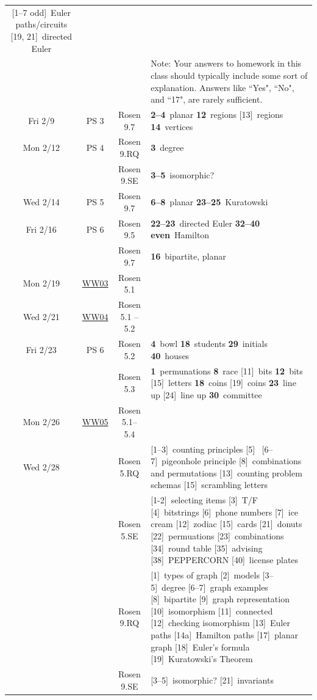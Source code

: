 \documentclass{scrartcl}
\def\WW#1{\href{https://mathwebwork.cs.calvin.edu/webwork2/Math252-S18-Pruim/WW#1}{WW#1}}
\def\hwn#1{\relax}
\def\hwn#1{\ {\tiny (#1)}}
\def\hwn#1{$_{\mbox{\ \tiny #1}}$}
\def\hwn#1{~{\tiny #1}}
\newcommand{\extra}[2][\relax]{[#2]\hwn{#1}}
\newcommand{\mand}[2][\relax]{{\bf \large #2}\hwn{#1}}
\begin{document}
\begin{center}
\begin{longtable}{|c|c|c|p{4.3in}|}
	 \extra[Euler paths/circuits]{1--7 odd}
	 \extra[directed Euler]{19, 21}
	 \\
	 &&& Note: Your answers to homework in this class
	 should typically include some sort of explanation.
	 Answers like ``Yes", ``No", and ``17", are rarely sufficient.
	 \\
	 \hline
	 Fri 2/9 & PS 3 & Rosen 9.7 &
	 \mand[planar]{2--4}
	 \mand[regions]{12}
	 \extra[regions]{13}
	 \mand[vertices]{14}
	 \\
	 \hline
	 Mon 2/12 & PS 4 & Rosen 9.RQ &
	 \mand[degree]{3}
	 \\
	 && Rosen 9.SE &
	 \mand[isomorphic?]{3--5}
	 \\
	 \hline
	 Wed 2/14 & PS 5 & Rosen 9.7 &
	 \mand[planar]{6--8}
	 \mand[Kuratowski]{23--25}
	 \\
	 \hline
	 Fri 2/16 & PS 6 & Rosen 9.5 &
	 \mand[directed Euler]{22--23}
	 \mand[Hamilton]{32--40 even}
	 \\
	 &  & Rosen 9.7 &
	 \mand[bipartite, planar]{16}
	 \\
	 \hline
	 Mon 2/19 & \WW{03} & Rosen 5.1 &
	 \\
	 \hline
	 Wed 2/21 & \WW{04} & Rosen 5.1 -- 5.2 &
	 \\
	 \hline
	 \newpage
	 Fri 2/23 & PS 6 & Rosen 5.2 &
	   \mand[bowl]{4}
	   \mand[students]{18}
	   \mand[initials]{29}
	   \mand[houses]{40}
	   \\
	   & & Rosen 5.3 &
	   \mand[permunations]{1}
	   \mand[race]{8}
	   \extra[bits]{11}
	   \mand[bits]{12}
	   \extra[letters]{15}
	   \mand[coins]{18}
	   \extra[coins]{19}
	   \mand[line up]{23}
	   \extra[line up]{24}
	   \mand[committee]{30}
	   \\
	   \hline
	 Mon 2/26 & \WW{05} & Rosen 5.1--5.4 &
	   \\
	   \hline
	 Wed 2/28 & & Rosen 5.RQ &
	 \extra[counting principles]{1--3}
	 \extra[]{5}
	 \extra[pigeonhole principle]{6--7}
	 \extra[combinations and permutations]{8}
	 \extra[counting problem schemas]{13}
	 \extra[scrambling letters]{15}
	 \\
	 & & Rosen 5.SE &
	 \extra[selecting items]{1-2}
	 \extra[T/F]{3}
	 \extra[bitstrings]{4}
	 \extra[phone numbers]{6}
	 \extra[ice cream]{7}
	 \extra[zodiac]{12}
	 \extra[cards]{15}
	 \extra[donuts]{21}
	 \extra[permuations]{22}
	 \extra[combinations]{23}
	 \extra[round table]{34}
	 \extra[advising]{35}
	 \extra[PEPPERCORN]{38}
	 \extra[license plates]{40}
	   \\
	 & & Rosen 9.RQ &
	 \extra[types of graph]{1}
	 \extra[models]{2}
	 \extra[degree]{3--5}
	 \extra[graph examples]{6--7}
	 \extra[bipartite]{8}
	 \extra[graph representation]{9}
	 \extra[isomorphism]{10}
	 \extra[connected]{11}
	 \extra[checking isomorphism]{12}
	 \extra[Euler paths]{13}
	 \extra[Hamilton paths]{14a}
	 \extra[planar graph]{17}
	 \extra[Euler's formula]{18}
	 \extra[Kuratowski's Theorem]{19}
	 \\
	 & & Rosen 9.SE &
	 \extra[isomorphic?]{3--5}
	 \extra[invariants]{21}
	 \\
	   \hline
\end{longtable}
\end{center}
\label{end}
\end{document}
